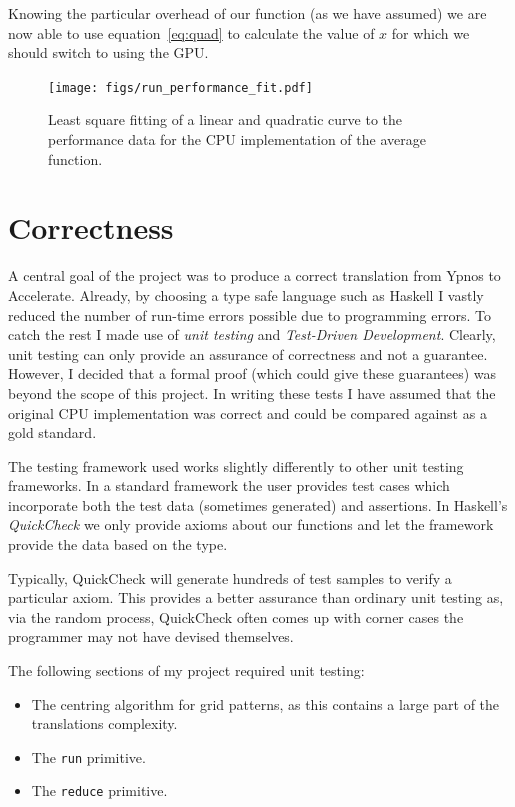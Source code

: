 \documentclass[12pt,a4paper,twoside]{scrbook}
\begin{document}
Knowing the particular overhead of our function (as we have assumed) we are now
able to use equation~\ref{eq:quad} to calculate the value of $x$ for which we
should switch to using the GPU.

\begin{figure}[h]
  \texttt{[image: figs/run\_performance\_fit.pdf]}
  \caption{Least square fitting of a linear and quadratic curve to the
    performance data for the CPU implementation of the average function.}
  \label{fig:fitting}
\end{figure}

\section{Correctness}

A central goal of the project was to produce a correct translation from
Ypnos to Accelerate. Already, by choosing a type safe language such as
Haskell I vastly reduced the number of run-time errors possible due to
programming errors. To catch the rest I made use of \emph{unit testing}
and \emph{Test-Driven Development}. Clearly, unit testing can only
provide an assurance of correctness and not a guarantee. However, I
decided that a formal proof (which could give these guarantees) was
beyond the scope of this project. In writing these tests I have assumed
that the original CPU implementation was correct and could be compared
against as a gold standard.

The testing framework used works slightly differently to other unit testing
frameworks. In a standard framework the user provides test cases which
incorporate both the test data (sometimes generated) and assertions. In
Haskell's \emph{QuickCheck} we only provide axioms about our functions and let
the framework provide the data based on the type.

Typically, QuickCheck will generate hundreds of test samples to verify a
particular axiom. This provides a better assurance than ordinary unit
testing as, via the random process, QuickCheck often comes up with corner
cases the programmer may not have devised themselves.

The following sections of my project required unit testing:

\begin{itemize}
\item
  The centring algorithm for grid patterns, as this contains a large
  part of the translations complexity.
\item
  The \texttt{run} primitive.
\item
  The \texttt{reduce} primitive.
\end{itemize}
\end{document}
